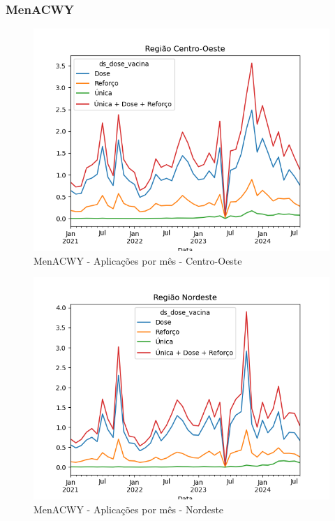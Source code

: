 \documentclass[12pt]{article}
\begin{document}
\subsubsection{MenACWY}
\begin{figure}[H]
    \centering
    \includegraphics[width=0.85\linewidth]{imagens/MenACWY-Centro-Oeste-Aplicacoes-mes}
    \caption{MenACWY - Aplicações por mês - Centro-Oeste}
    \label{fig:MenACWY-centro-oeste-aplicacoes}
\end{figure}
\begin{figure}[H]
    \centering
    \includegraphics[width=0.85\linewidth]{imagens/MenACWY-Nordeste-Aplicacoes-mes}
    \caption{MenACWY - Aplicações por mês - Nordeste}
    \label{fig:MenACWY-nordeste-aplicacoes-mes}
\end{figure}
\end{document}
